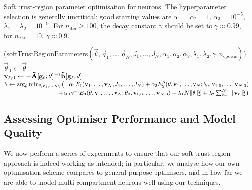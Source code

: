 \begin{algorithm}[t]
	\begin{minipage}{0.98\textwidth}
	\caption[Soft trust-region parameter optimisation for $n$-LIF neurons]{Soft trust-region parameter optimisation for \nlif neurons. 
	The hyperparameter selection is generally uncritical; good starting values are $\alpha_1 = \alpha_2 = 1$, $\alpha_3 = 10^{-5}$, $\lambda_1 = \lambda_2 = 10^{-9}$.
	For $n_\mathrm{iter} \geq 100$, the decay constant $\gamma$ should be set to $\gamma \approx 0.99$, for $n_\mathrm{iter} = 10$, $\gamma \approx 0.9$.
	}
	\label{alg:nlif_tr_parameters}
	\end{minipage}
	\sffamily\small
	\Begin(softTrustRegionParameters${(\vec \theta, \vec g_1, \ldots, \vec g_N, J_1, \ldots, J_N, \alpha_1, \alpha_2, \alpha_3, \lambda_1, \lambda_2, \gamma, n_\mathrm{epochs})}$)
	{
		{
			$\vec \theta_0 \gets \vec \theta$ \\
			{
				$\vec v_{\ell, 0} \gets -\mrA[\vec g_\ell; \vec \theta]^{-1} \vrb[\vec g_\ell; \vec \theta]$
			}
			$\vec \theta \gets
				\arg_{\vec \theta}\min_{\vec \theta, \vec v_1, \ldots, \vec v_N}
					\bigl( \hphantom{+} \alpha_1 E_1(\vec v_1, \ldots, \vec v_{N}, J_1, \ldots, J_N)
				+ \alpha_2 E_2''(\vec \theta, \vec v_1, \ldots, \vec v_N; \vec \theta_0, \vec v_{1,0}, \ldots, \vec v_{N, 0})$ \\
			$\hspace{9.15em} + \alpha_3 \gamma^{-i} E_3(\vec \theta, \vec v_1, \ldots, \vec v_N; \vec \theta_0, \vec v_{1,0}, \ldots, \vec v_{N, 0}) + \lambda_1 N \|\vec \theta\|_2^2 + \lambda_2 \sum_{\ell = 1}^N \| \vec v_{\ell} \|_2^2 \bigr)$
		}
		\Return{$\vec \theta$}
	}
\end{algorithm}

\subsection{Assessing Optimiser Performance and Model Quality}
\label{sec:nlif_opt_parameters_experiment}

We now perform a series of experiments to ensure that our soft trust-region approach is indeed working as intended; in particular, we analyse how our own optimisation scheme compares to general-purpose optimisers, and in how far we are able to model multi-compartment neurons well using our techniques.

